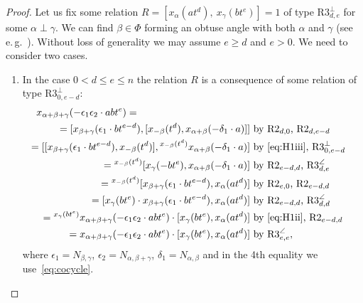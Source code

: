 \documentclass[10pt,a4paper,twoside]{article}
\theoremstyle{remark}
\theoremstyle{definition}
\numberwithin{lemma}{section}
\numberwithin{prop}{section}
\numberwithin{corollary}{section}
\numberwithin{externaltheorem}{section}
\numberwithin{equation}{section}
\begin{document}
\begin{proof}
Let us fix some relation $R = [x_\alpha(at^d),\ x_\gamma(bt^e)] = 1$ of type $\text{R3}^\bot_{d,e}$ for some $\alpha\perp\gamma$. We can find $\beta \in \Phi$ forming an obtuse angle with both $\alpha$ and $\gamma$ (see e.\,g.~\cite[Lemma~3.1.2]{RS76}).
Without loss of generality we may assume $e \geq d$ and $e > 0$. We need to consider two cases.
\begin{enumerate}
\item In the case $0 < d \leq e \leq n$ the relation $R$ is a consequence of some relation of type $\text{R3}^\bot_{0,e-d}$:
\begin{align} x_{\alpha+\beta+\gamma}(-\epsilon_1 \epsilon_2 \cdot abt^e) = \hspace{4cm} \label{first-computation} \\ =
[x_{\beta+\gamma}(\epsilon_1 \cdot bt^{e-d}), [x_{-\beta}(t^d), x_{\alpha+\beta}(-\delta_1 \cdot a)] ] & \text{ by $\text{R2}_{d,0}$, $\text{R2}_{d, e-d}$} \nonumber \\ 
 = [[x_{\beta+\gamma}(\epsilon_1 \cdot bt^{e-d}), x_{-\beta}(t^d)], {}^{x_{-\beta}(t^d)} x_{\alpha+\beta}(- \delta_1 \cdot a)] & \text{ by~\eqref{eq:H1iii}, $\text{R3}^\bot_{0,e-d}$} \nonumber \\ 
 = {}^{x_{-\beta}(t^d)} [x_{\gamma}(- bt^e), x_{\alpha+\beta}(-\delta_1 \cdot a)] & \text{ by $\text{R2}_{e-d,d}$, $\text{R3}^\angle_{d,e}$} \nonumber \\ 
 = {}^{x_{-\beta}(t^d)} [x_{\beta + \gamma}(\epsilon_1 \cdot bt^{e-d}), x_{\alpha}(at^d)] & \text{ by $\text{R2}_{e,0}$, $\text{R2}_{e-d,d}$} \nonumber \\ 
 = [x_{\gamma}(bt^e) \cdot x_{\beta + \gamma}(\epsilon_1 \cdot bt^{e-d}), x_{\alpha}(at^d)] & \text{ by $\text{R2}_{e-d,d}$, $\text{R3}^\angle_{d,d}$} \nonumber \\ 
 = {}^{x_\gamma(bt^e)}x_{\alpha+\beta+\gamma}(-\epsilon_1\epsilon_2 \cdot abt^e) \cdot [x_\gamma(bt^e), x_\alpha(at^d)] & \text{ by~\eqref{eq:H1ii}, $\text{R2}_{e-d,d}$} \nonumber \\
 = x_{\alpha+\beta+\gamma}(-\epsilon_1\epsilon_2 \cdot abt^e) \cdot [x_\gamma(bt^e), x_\alpha(at^d)] & \text{ by $\text{R3}^\angle_{e,e}$}, \nonumber \end{align}
 where $\epsilon_1 = N_{\beta,\gamma}$, $\epsilon_2 = N_{\alpha,\beta+\gamma}$, $\delta_1 = N_{\alpha,\beta}$ and in the 4th equality we use~\eqref{eq:cocycle}.
  

\end{enumerate}
\end{proof}
\end{document}
